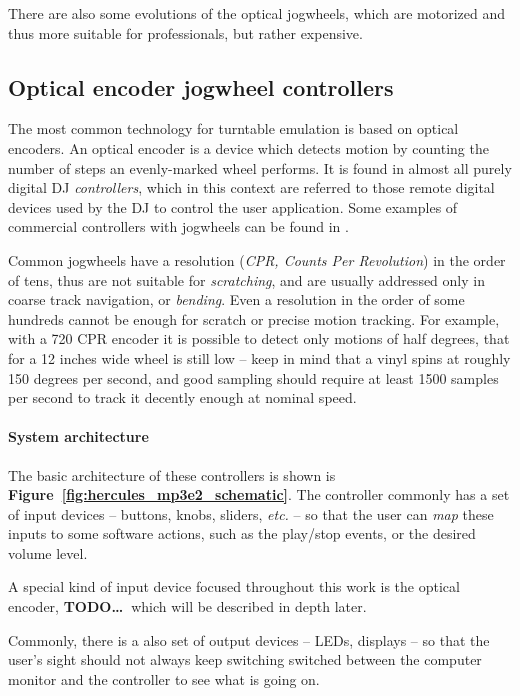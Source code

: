 \documentclass[a4paper,10pt]{article}
\newcommand{\TODO}{\textbf{TODO\dots\ }}
\newcommand{\citef}[1]{\textbf{Figure~\ref{#1}}}
\begin{document}
\begin{multicols}{2}
There are also some evolutions of the optical jogwheels, which are motorized
\cite{denon_sc3900} \cite{numark_v7} and thus more suitable for professionals,
but rather expensive.


\subsection{Optical encoder jogwheel controllers}

The most common technology for turntable emulation is based on optical encoders.
An optical encoder is a device which detects motion by counting the number of
steps an evenly-marked wheel performs. It is found in almost all purely digital
DJ \emph{controllers}, which in this context are referred to those remote
digital devices used by the DJ to control the user application. Some examples
of commercial controllers with jogwheels can be found in \cite{eks_op}
\cite{pioneer_ddjs1} \cite{vestax_vci400}.

Common jogwheels have a resolution (\emph{CPR, Counts Per Revolution}) in the
order of tens, thus are not suitable for \emph{scratching}, and are usually
addressed only in coarse track navigation, or \emph{bending}.
Even a resolution in the order of some hundreds cannot be enough for scratch
or precise motion tracking. For example, with a 720 CPR encoder it is possible
to detect only motions of half degrees, that for a 12 inches wide wheel is
still low -- keep in mind that a vinyl spins at roughly 150 degrees per second,
and good sampling should require at least 1500 samples per second to track it
decently enough at nominal speed.


\paragraph{System architecture}
The basic architecture of these controllers is shown is \citef{fig:hercules_mp3e2_schematic}.
The controller commonly has a set of input devices -- buttons, knobs,
sliders, \emph{etc.} -- so that the user can \emph{map} these inputs to some
software actions, such as the play/stop events, or the desired volume level.

A special kind of input device focused throughout this work is the optical
encoder, \TODO which will be described in depth later.

Commonly, there is a also set of output devices -- LEDs, displays -- so that
the user's sight should not always keep switching switched between the computer
monitor and the controller to see what is going on.


\end{multicols}
\end{document}
